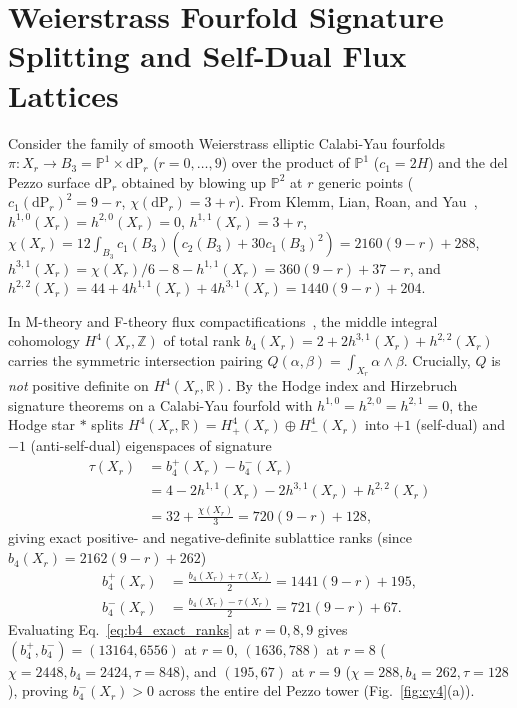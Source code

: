 \documentclass[aps,prd,twocolumn,nofootinbib,floatfix]{revtex4-2}
\begin{document}
\section{Weierstrass Fourfold Signature Splitting and Self-Dual Flux Lattices}
\label{sec:cy4}

Consider the family of smooth Weierstrass elliptic Calabi-Yau fourfolds $\pi: X_r \to B_3 = \mathbb{P}^1 \times \mathrm{dP}_r$ ($r = 0,\dots,9$) over the product of $\mathbb{P}^1$ ($c_1 = 2H$) and the del Pezzo surface $\mathrm{dP}_r$ obtained by blowing up $\mathbb{P}^2$ at $r$ generic points ($c_1(\mathrm{dP}_r)^2 = 9 - r$, $\chi(\mathrm{dP}_r) = 3 + r$).
From Klemm, Lian, Roan, and Yau~\cite{KlemmLianRoanYau1997}, $h^{1,0}(X_r) = h^{2,0}(X_r) = 0$, $h^{1,1}(X_r) = 3 + r$, $\chi(X_r) = 12\int_{B_3} c_1(B_3)(c_2(B_3) + 30 c_1(B_3)^2) = 2160(9 - r) + 288$, $h^{3,1}(X_r) = \chi(X_r)/6 - 8 - h^{1,1}(X_r) = 360(9 - r) + 37 - r$, and $h^{2,2}(X_r) = 44 + 4h^{1,1}(X_r) + 4h^{3,1}(X_r) = 1440(9 - r) + 204$.

In M-theory and F-theory flux compactifications~\cite{GukovVafaWitten2000,BoussoPolchinski2000}, the middle integral cohomology $H^4(X_r,\mathbb{Z})$ of total rank $b_4(X_r) = 2 + 2h^{3,1}(X_r) + h^{2,2}(X_r)$ carries the symmetric intersection pairing $Q(\alpha,\beta) = \int_{X_r} \alpha \wedge \beta$.
Crucially, $Q$ is \emph{not} positive definite on $H^4(X_r,\mathbb{R})$.
By the Hodge index and Hirzebruch signature theorems on a Calabi-Yau fourfold with $h^{1,0} = h^{2,0} = h^{2,1} = 0$, the Hodge star $*$ splits $H^4(X_r,\mathbb{R}) = H^4_+(X_r) \oplus H^4_-(X_r)$ into $+1$ (self-dual) and $-1$ (anti-self-dual) eigenspaces of signature
\begin{align}
\label{eq:cy4_signature}
\tau(X_r) &= b_4^+(X_r) - b_4^-(X_r) \nonumber\\
&= 4 - 2h^{1,1}(X_r) - 2h^{3,1}(X_r) + h^{2,2}(X_r) \nonumber\\
&= 32 + \frac{\chi(X_r)}{3} = 720(9 - r) + 128,
\end{align}
giving exact positive- and negative-definite sublattice ranks (since $b_4(X_r) = 2162(9 - r) + 262$)
\begin{align}
\label{eq:b4_exact_ranks}
b_4^+(X_r) &= \frac{b_4(X_r) + \tau(X_r)}{2} = 1441(9 - r) + 195, \nonumber\\
b_4^-(X_r) &= \frac{b_4(X_r) - \tau(X_r)}{2} = 721(9 - r) + 67.
\end{align}
Evaluating Eq.~\eqref{eq:b4_exact_ranks} at $r = 0, 8, 9$ gives $(b_4^+, b_4^-) = (13164, 6556)$ at $r = 0$, $(1636, 788)$ at $r = 8$ ($\chi = 2448, b_4 = 2424, \tau = 848$), and $(195, 67)$ at $r = 9$ ($\chi = 288, b_4 = 262, \tau = 128$), proving $b_4^-(X_r) > 0$ across the entire del Pezzo tower (Fig.~\ref{fig:cy4}(a)).
\end{document}
